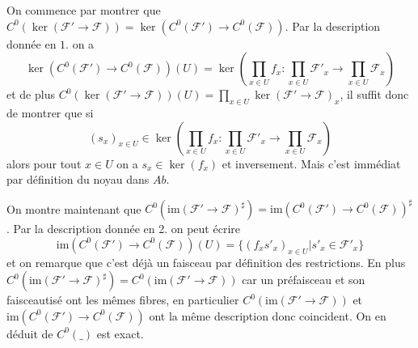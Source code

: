 \documentclass[a4paper,12pt]{article}
\newcommand{\F}{\mathscr F}
\newcommand{\im}{\textrm{im}}
\theoremstyle{plain}
\theoremstyle{definition}
\theoremstyle{remark}
\begin{document}
On commence par montrer que
$C^0(\ker(\F'\to \F))=\ker(C^0(\F')\to C^0(\F))$. Par la description
donnée en $1.$ on a 
\[\ker(C^0(\F')\to C^0(\F))(U)=\ker(\prod_{x\in U} f_x\colon \prod_{x\in U} \F'_x\to \prod_{x\in U} \F_x)\]
et de plus $C^0(\ker(\F'\to \F))(U)=\prod_{x\in U}\ker(\F'\to\F)_x$, 
il suffit donc de montrer que si 
\[(s_x)_{x\in U}\in \ker(\prod_{x\in U} f_x\colon \prod_{x\in U} \F'_x\to \prod_{x\in U} \F_x)\]
alors pour tout $x\in U$ on a $s_x\in \ker(f_x)$ et inversement.
Mais c'est immédiat par définition du noyau dans $Ab$. 

On montre maintenant que 
$C^0(\im(\F'\to \F)^\sharp)=\im(C^0(\F')\to C^0(\F))^\sharp$.
Par la description donnée en 2. on peut écrire 
\[\im(C^0(\F')\to C^0(\F))(U)=\{(f_xs'_x)_{x\in U}| s'_x\in \F'_x\}\]
et on remarque que c'est déjà un faisceau par définition des 
restrictions. En plus $C^0(\im(\F'\to \F)^\sharp)=C^0(\im(\F'\to\F))$
car un préfaisceau et son faisceautisé ont les mêmes fibres, en
particulier $C^0(\im(\F'\to\F))$ et $\im(C^0(\F')\to C^0(\F))$ ont 
la même description donc coincident. On en déduit de $C^0(\_)$ est
exact.
\end{document}
